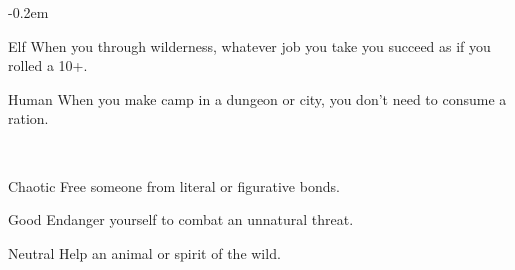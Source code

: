 \documentclass[8pt]{extarticle}
\begin{document}
\openup -0.2em

\charbanner

\begin{minipage}[t]{3.2in}

\begin{optfeature}{Elf}
  When you  through wilderness,
  whatever job you take you succeed as if you rolled a 10+.
\end{optfeature}

\begin{optfeature}{Human}
  When you make camp in a dungeon or city, you don’t need to consume a
  ration.
\end{optfeature}

\ 


\begin{optfeature}{Chaotic}
  Free someone from literal or figurative bonds.
\end{optfeature}

\begin{optfeature}{Good}
  Endanger yourself to combat an unnatural threat.
\end{optfeature}

\begin{optfeature}{Neutral}
  Help an animal or spirit of the wild.
\end{optfeature}

\ 


\vfill\null
\end{minipage}
\end{document}
